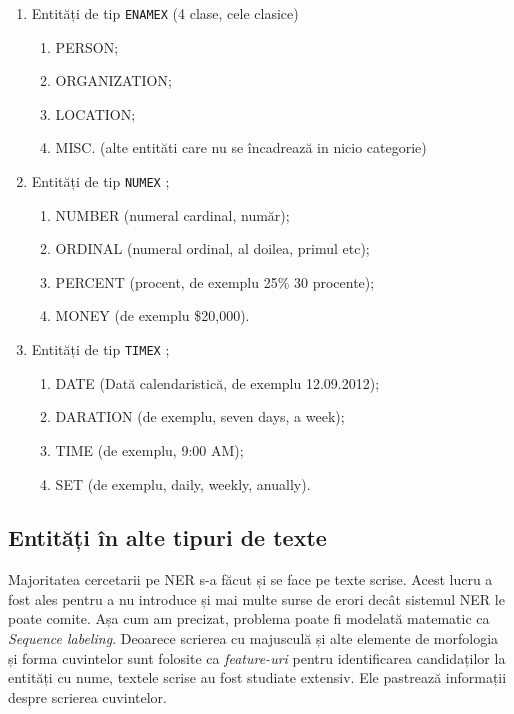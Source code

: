 \begin{enumerate}
	\item Entități de tip \texttt{ENAMEX} (4 clase, cele clasice)
	\begin{enumerate}
		\item PERSON;
		\item ORGANIZATION;
		\item LOCATION;
		\item MISC. (alte entităti care nu se încadrează in nicio categorie)
	\end{enumerate}


	\item Entități de tip \texttt{NUMEX} ;

	\begin{enumerate}
		\item NUMBER (numeral cardinal, număr);
		\item ORDINAL (numeral ordinal, al doilea, primul etc);
		\item PERCENT (procent, de exemplu 25\% 30 procente);
		\item MONEY (de exemplu \$20,000).
	\end{enumerate}
	
		\item Entități de tip \texttt{TIMEX} ;
	
		\begin{enumerate}
			\item DATE (Dată calendaristică, de exemplu 12.09.2012);
			\item DARATION (de exemplu, seven days, a week);
			\item TIME (de exemplu, 9:00 AM);
			\item SET (de exemplu, daily, weekly, anually).
		\end{enumerate}


\end{enumerate}

\subsection{Entități în alte tipuri de texte}

Majoritatea cercetarii pe NER s-a făcut și se face pe texte scrise. Acest lucru a fost ales pentru a nu introduce și mai multe surse de erori decât sistemul NER le poate comite. Așa cum am precizat, problema poate fi modelată matematic ca \textit{Sequence labeling}. Deoarece scrierea cu majusculă și alte elemente de morfologia și forma cuvintelor sunt folosite ca \textit{feature-uri} pentru identificarea candidaților la entități cu nume, textele scrise au fost studiate extensiv. Ele pastrează informații despre scrierea cuvintelor.

